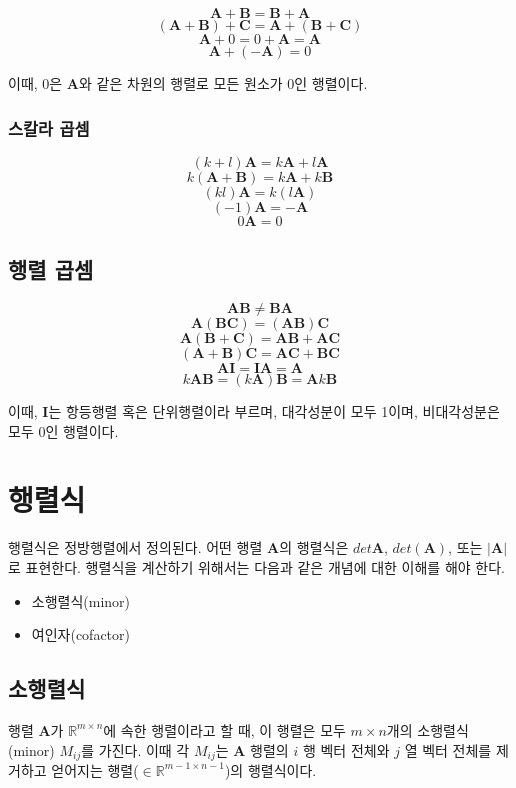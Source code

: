 $$\mathbf A + \mathbf B = \mathbf B + \mathbf A$$
$$(\mathbf A + \mathbf B ) + \mathbf C = \mathbf A + ( \mathbf B + \mathbf C ) $$
$$ \mathbf A + 0 = 0 + \mathbf A = \mathbf A$$
$$ \mathbf A + (- \mathbf A ) = 0$$

이때, 0은 $\mathbf A$와 같은 차원의 행렬로 모든 원소가 0인 행렬이다.

\subsubsection{스칼라 곱셈}

$$(k+l) \mathbf A = k \mathbf A + l \mathbf A$$
$$k (\mathbf A + \mathbf B ) = k \mathbf A + k \mathbf B$$
$$(kl) \mathbf A = k (l \mathbf A)$$
$$ (-1) \mathbf A = -\mathbf A$$
$$ 0 \mathbf A = 0$$

\subsection{행렬 곱셈}

$$\mathbf{AB} \neq \mathbf {BA}$$
$$\mathbf{A(BC)} = \mathbf{(AB)C}$$
$$\mathbf{A(B+C)} = \mathbf {AB} + \mathbf {AC}$$
$$\mathbf{(A+B)C} = \mathbf{AC} + \mathbf{BC}$$
$$\mathbf{AI} = \mathbf{IA} = \mathbf A$$
$$k \mathbf{AB} = (k\mathbf A)\mathbf B = \mathbf A k \mathbf B$$

이때, $\mathbf I$는 항등행렬 혹은 단위행렬이라 부르며, 대각성분이 모두 1이며, 비대각성분은 모두 0인 행렬이다.

\section{행렬식}

행렬식은 정방행렬에서 정의된다. 어떤 행렬 $\mathbf A$의 행렬식은 $det \mathbf A$, $det(\mathbf A)$, 또는 $|\mathbf A|$로 표현한다.
행렬식을 계산하기 위해서는 다음과 같은 개념에 대한 이해를 해야 한다.
\begin{itemize}
\item 소행렬식(minor)
\item 여인자(cofactor)
\end{itemize}

\subsection{소행렬식}

행렬 $\mathbf A$가 $\mathbb R^{m \times n}$에 속한 행렬이라고 할 때, 이 행렬은
모두 $m \times n$개의 소행렬식(minor) $M_{ij}$를 가진다.
이때 각 $M_{ij}$는 $\mathbf A$ 행렬의 $i$ 행 벡터 전체와 $j$ 열 벡터 전체를 제거하고 얻어지는 행렬($\in \mathbb R^{m-1 \times n-1}$)의 
행렬식이다.

